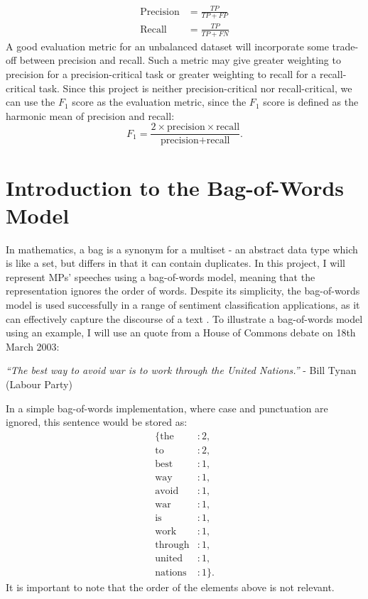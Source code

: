 \documentclass[12pt,a4paper,twoside,openright]{report}
\begin{document}
\begin{align}
	\text{Precision} & = \frac{TP}{TP + FP} \\
	\text{Recall} & = \frac{TP}{TP + FN}
\end{align}
A good evaluation metric for an unbalanced dataset will incorporate some trade-off between precision and recall. Such a metric may give greater weighting to precision for a precision-critical task or greater weighting to recall for a recall-critical task. Since this project is neither precision-critical nor recall-critical, we can use the $F_1$ score as the evaluation metric, since the $F_1$ score is defined as the harmonic mean of precision and recall:
\begin{equation}
	F_1 = \frac{2 \times \text{precision} \times \text{recall}}{\text{precision} + \text{recall}}.
\end{equation}
\section{Introduction to the Bag-of-Words Model}

In mathematics, a bag is a synonym for a multiset - an abstract data type which is like a set, but differs in that it can contain duplicates. In this project, I will represent MPs' speeches using a bag-of-words model, meaning that the representation ignores the order of words. Despite its simplicity, the bag-of-words model is used successfully in a range of sentiment classification applications, as it can effectively capture the discourse of a text \cite{nlp_book}.
\newline
\newline
To illustrate a bag-of-words model using an example, I will use an quote from a House of Commons debate on 18th March 2003:
\begin{center}
	\textit{``The best way to avoid war is to work through the United Nations.''}
	\newline
	 - Bill Tynan (Labour Party)
\end{center}
In a simple bag-of-words implementation, where case and punctuation are ignored, this sentence would be stored as:
\begin{align*}
	\{\text{the}&: 2,\\ \text{to}&: 2,\\ \text{best}&: 1,\\ \text{way}&: 1,\\ \text{avoid}&: 1,\\ \text{war}&: 1,\\ \text{is}&: 1,\\ \text{work}&: 1,\\ \text{through}&: 1,\\ \text{united}&: 1,\\ \text{nations}&: 1\}.
\end{align*}
It is important to note that the order of the elements above is not relevant.
\end{document}
